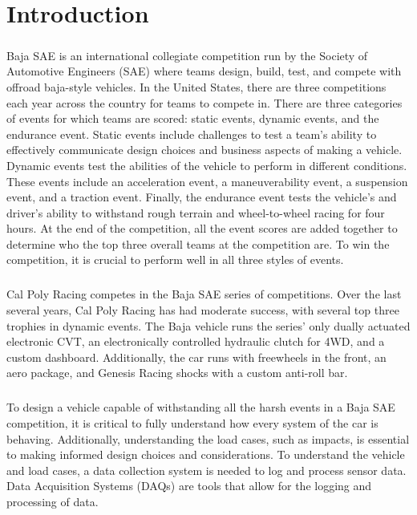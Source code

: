 \chapter{Introduction}

\paragraph{}
Baja SAE is an international collegiate competition run by the Society of Automotive Engineers (SAE) \cite{SAE} where teams design, build, test, and compete with offroad baja-style vehicles.
In the United States, there are three competitions each year across the country for teams to compete in. 
There are three categories of events for which teams are scored: static events, dynamic events, and the endurance event.  
Static events include challenges to test a team's ability to effectively communicate design choices and business aspects of making a vehicle.  
Dynamic events test the abilities of the vehicle to perform in different conditions.  
These events include an acceleration event, a maneuverability event, a suspension event, and a traction event.  
Finally, the endurance event tests the vehicle's and driver's ability to withstand rough terrain and wheel-to-wheel racing for four hours.
At the end of the competition, all the event scores are added together to determine who the top three overall teams at the competition are.
To win the competition, it is crucial to perform well in all three styles of events.

\paragraph{}
Cal Poly Racing \cite{CalPolyRacing} competes in the Baja SAE series of competitions.
Over the last several years, Cal Poly Racing has had moderate success, with several top three trophies in dynamic events.
The Baja vehicle runs the series' only dually actuated electronic CVT, an electronically controlled hydraulic clutch for 4WD, and a custom dashboard.
Additionally, the car runs with freewheels in the front, an aero package, and Genesis Racing shocks with a custom anti-roll bar.

\paragraph{}
To design a vehicle capable of withstanding all the harsh events in a Baja SAE competition, it is critical to fully understand how every system of the car is behaving.
Additionally, understanding the load cases, such as impacts, is essential to making informed design choices and considerations.
To understand the vehicle and load cases, a data collection system is needed to log and process sensor data.
Data Acquisition Systems (DAQs) are tools that allow for the logging and processing of data.

